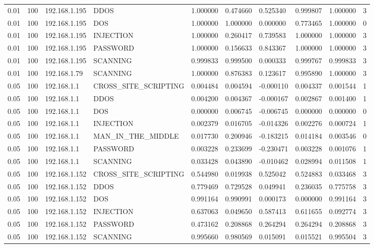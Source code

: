 \begin{tabular}{llllllllll}
0.01 & 100 & 192.168.1.195 & DDOS & 1.000000 & 0.474660 & 0.525340 & 0.999807 & 1.000000 & 3 \\
0.01 & 100 & 192.168.1.195 & DOS & 1.000000 & 1.000000 & 0.000000 & 0.773465 & 1.000000 & 0 \\
0.01 & 100 & 192.168.1.195 & INJECTION & 1.000000 & 0.260417 & 0.739583 & 1.000000 & 1.000000 & 3 \\
0.01 & 100 & 192.168.1.195 & PASSWORD & 1.000000 & 0.156633 & 0.843367 & 1.000000 & 1.000000 & 3 \\
0.01 & 100 & 192.168.1.195 & SCANNING & 0.999833 & 0.999500 & 0.000333 & 0.999767 & 0.999833 & 3 \\
0.01 & 100 & 192.168.1.79 & SCANNING & 1.000000 & 0.876383 & 0.123617 & 0.995890 & 1.000000 & 3 \\
0.05 & 100 & 192.168.1.1 & CROSS\_SITE\_SCRIPTING & 0.004484 & 0.004594 & -0.000110 & 0.004337 & 0.001544 & 1 \\
0.05 & 100 & 192.168.1.1 & DDOS & 0.004200 & 0.004367 & -0.000167 & 0.002867 & 0.001400 & 1 \\
0.05 & 100 & 192.168.1.1 & DOS & 0.000000 & 0.006745 & -0.006745 & 0.000000 & 0.000000 & 0 \\
0.05 & 100 & 192.168.1.1 & INJECTION & 0.002379 & 0.016705 & -0.014326 & 0.002276 & 0.000724 & 1 \\
0.05 & 100 & 192.168.1.1 & MAN\_IN\_THE\_MIDDLE & 0.017730 & 0.200946 & -0.183215 & 0.014184 & 0.003546 & 0 \\
0.05 & 100 & 192.168.1.1 & PASSWORD & 0.003228 & 0.233699 & -0.230471 & 0.003228 & 0.001076 & 1 \\
0.05 & 100 & 192.168.1.1 & SCANNING & 0.033428 & 0.043890 & -0.010462 & 0.028994 & 0.011508 & 1 \\
0.05 & 100 & 192.168.1.152 & CROSS\_SITE\_SCRIPTING & 0.544980 & 0.019938 & 0.525042 & 0.524883 & 0.033468 & 3 \\
0.05 & 100 & 192.168.1.152 & DDOS & 0.779469 & 0.729528 & 0.049941 & 0.236035 & 0.775758 & 3 \\
0.05 & 100 & 192.168.1.152 & DOS & 0.991164 & 0.990991 & 0.000173 & 0.000000 & 0.991164 & 3 \\
0.05 & 100 & 192.168.1.152 & INJECTION & 0.637063 & 0.049650 & 0.587413 & 0.611655 & 0.092774 & 3 \\
0.05 & 100 & 192.168.1.152 & PASSWORD & 0.473162 & 0.208868 & 0.264294 & 0.264294 & 0.208868 & 3 \\
0.05 & 100 & 192.168.1.152 & SCANNING & 0.995660 & 0.980569 & 0.015091 & 0.015521 & 0.995504 & 3 \\

\end{tabular}
